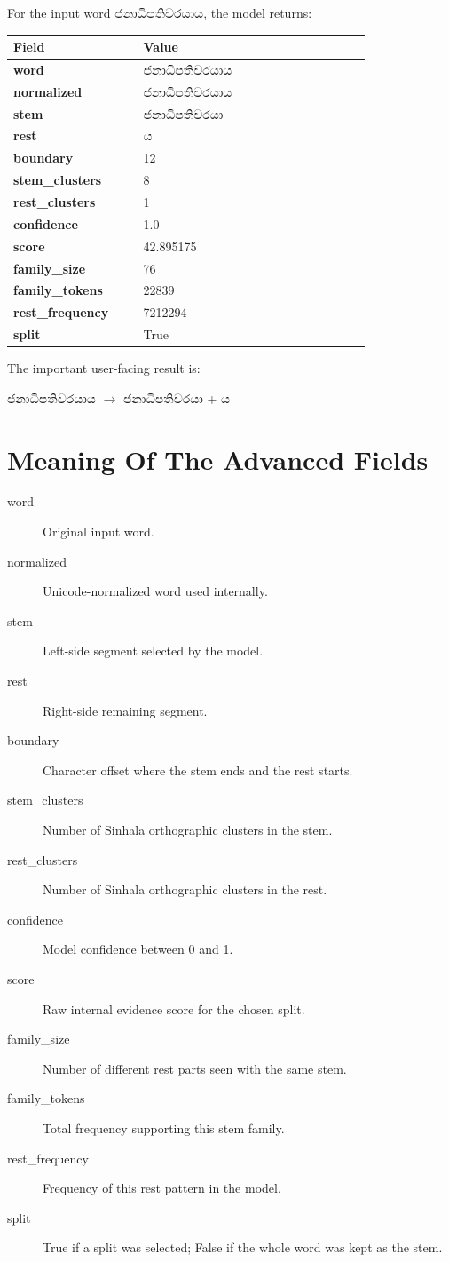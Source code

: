 \documentclass[11pt]{article}
\newcommand{\si}[1]{{\sinhalafont #1}}
\begin{document}
For the input word \si{ජනාධිපතිවරයාය}, the model returns:

\begin{center}
\begin{tabular}{>{\bfseries}p{0.28\linewidth}p{0.52\linewidth}}
\toprule
Field & Value \\
\midrule
word & \si{ජනාධිපතිවරයාය} \\
normalized & \si{ජනාධිපතිවරයාය} \\
stem & \si{ජනාධිපතිවරයා} \\
rest & \si{ය} \\
boundary & 12 \\
stem\_clusters & 8 \\
rest\_clusters & 1 \\
confidence & 1.0 \\
score & 42.895175 \\
family\_size & 76 \\
family\_tokens & 22839 \\
rest\_frequency & 7212294 \\
split & True \\
\bottomrule
\end{tabular}
\end{center}

The important user-facing result is:

\begin{center}
\large \si{ජනාධිපතිවරයාය} \(\rightarrow\) \si{ජනාධිපතිවරයා} + \si{ය}
\end{center}

\section*{Meaning Of The Advanced Fields}

\begin{description}
  \item[word] Original input word.
  \item[normalized] Unicode-normalized word used internally.
  \item[stem] Left-side segment selected by the model.
  \item[rest] Right-side remaining segment.
  \item[boundary] Character offset where the stem ends and the rest starts.
  \item[stem\_clusters] Number of Sinhala orthographic clusters in the stem.
  \item[rest\_clusters] Number of Sinhala orthographic clusters in the rest.
  \item[confidence] Model confidence between 0 and 1.
  \item[score] Raw internal evidence score for the chosen split.
  \item[family\_size] Number of different rest parts seen with the same stem.
  \item[family\_tokens] Total frequency supporting this stem family.
  \item[rest\_frequency] Frequency of this rest pattern in the model.
  \item[split] True if a split was selected; False if the whole word was kept as
  the stem.
\end{description}
\end{document}
